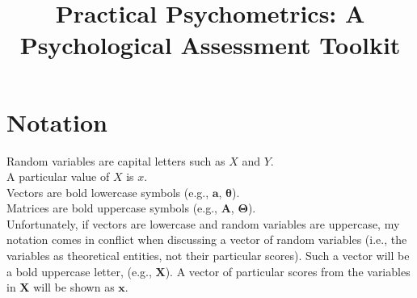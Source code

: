 \documentclass[nohyper,justified,marginals=raggedright]{tufte-book}\usepackage[]{graphicx}\usepackage[]{color}
\title{Practical Psychometrics: A Psychological Assessment Toolkit}
\begin{document}
\setcounter{secnumdepth}{1}
\setcounter{tocdepth}{1}

\chapter{Notation}
Random variables are capital letters such as $X$ and $Y$.\\
A particular value of $X$ is $x$.\\
Vectors are bold lowercase symbols (e.g., $\boldsymbol{a}$, $\boldsymbol{\theta}$).\\
Matrices are bold uppercase symbols (e.g., $\boldsymbol{A}$, $\boldsymbol{\Theta}$).\\

Unfortunately, if vectors are lowercase and random variables are uppercase, my notation comes in conflict when discussing a vector of random variables (i.e., the variables as theoretical entities, not their particular scores). Such a vector will be a bold uppercase letter, (e.g., $\boldsymbol{X}$). A vector of particular scores from the variables in $\boldsymbol{X}$ will be shown as $\boldsymbol{x}$.
\end{document}
